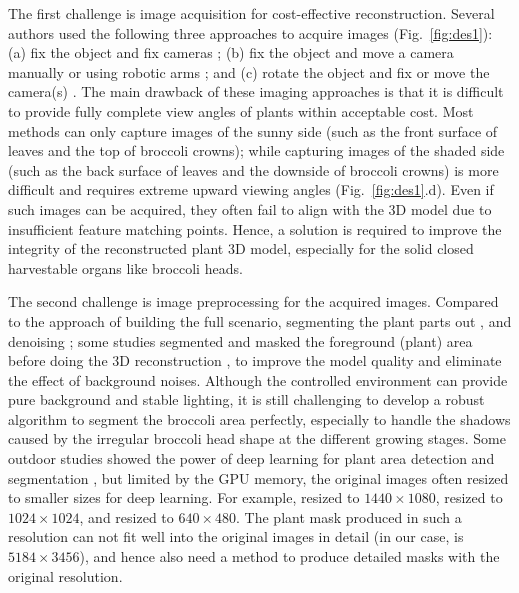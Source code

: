 The first challenge is image acquisition for cost-effective reconstruction. Several authors used the following three approaches to acquire images (Fig.~\ref{fig:des1}): (a) fix the object and fix cameras \citep{nguyen_structured_2015}; (b) fix the object and move a camera manually \citep{xiao_image-based_2020} or using robotic arms \citep{cao_quantifying_2019,nguyen_3d_2016}; and (c) rotate the object and fix or move the camera(s) \citep{kochi_3d_2018,gao_novel_2021}. The main drawback of these imaging approaches is that it is difficult to provide fully complete view angles of plants within acceptable cost. Most methods can only capture images of the sunny side (such as the front surface of leaves and the top of broccoli crowns); while capturing images of the shaded side (such as the back surface of leaves and the downside of broccoli crowns) is more difficult and requires extreme upward viewing angles (Fig.~\ref{fig:des1}.d). Even if such images can be acquired, they often fail to align with the 3D model due to insufficient feature matching points. Hence, a solution is required to improve the integrity of the reconstructed plant 3D model, especially for the solid closed harvestable organs like broccoli heads.

The second challenge is image preprocessing for the acquired images. Compared to the approach of building the full scenario, segmenting the plant parts out \citep{ge_method_2019}, and denoising \citep{wu_mvs-pheno_2020}; some studies segmented and masked the foreground (plant) area before doing the 3D reconstruction \citep{nguyen_3d_2016,kochi_3d_2018}, to improve the model quality and eliminate the effect of background noises. Although the controlled environment can provide pure background and stable lighting, it is still challenging to develop a robust algorithm to segment the broccoli area perfectly, especially to handle the shadows caused by the irregular broccoli head shape at the different growing stages. Some outdoor studies showed the power of deep learning for plant area detection and segmentation \citep{zhou_monitoring_2020,blok_effect_2021,garcia_towards_2021}, but limited by the GPU memory, the original images often resized to smaller sizes for deep learning. For example, \citet{zhou_monitoring_2020} resized to $1440 \times 1080$, \citet{blok_effect_2021} resized to $1024 \times 1024$, and \citet{garcia_towards_2021} resized to $640 \times 480$. The plant mask produced in such a resolution can not fit well into the original images in detail (in our case, is $5184 \times 3456$), and hence also need a method to produce detailed masks with the original resolution.

